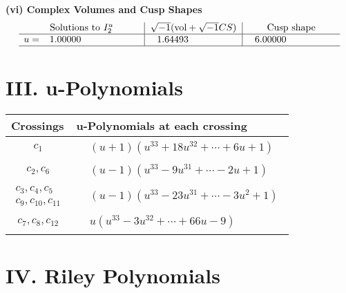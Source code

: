 \documentclass[1p]{elsarticle_modified}
\theoremstyle{definition}
\newcommand{\I}{\sqrt{-1}}
\begin{document}
\newpage\flushleft \textbf{(vi) Complex Volumes and Cusp Shapes}
$$\begin{array}{c|c|c}  
\text{Solutions to }I^u_{2}& \I (\text{vol} + \sqrt{-1}CS) & \text{Cusp shape}\\
 \hline 
\begin{aligned}
u &= \phantom{-}1.00000\phantom{ +0.000000I}\end{aligned}
 & \phantom{-}1.64493\phantom{ +0.000000I} & \phantom{-}6.00000\phantom{ +0.000000I}\\
 \hline 
 \end{array}$$\newpage
\newpage\renewcommand{\arraystretch}{1}
\centering \section*{ III. u-Polynomials}
\begin{tabular}{m{50pt}|m{274pt}}
Crossings & \hspace{64pt}u-Polynomials at each crossing \\
\hline $$\begin{aligned}c_{1}\end{aligned}$$&$\begin{aligned}
&(u+1)(u^{33}+18 u^{32}+\cdots+6 u+1)
\end{aligned}$\\
\hline $$\begin{aligned}c_{2},c_{6}\end{aligned}$$&$\begin{aligned}
&(u-1)(u^{33}-9 u^{31}+\cdots-2 u+1)
\end{aligned}$\\
\hline $$\begin{aligned}c_{3},c_{4},c_{5}\\c_{9},c_{10},c_{11}\end{aligned}$$&$\begin{aligned}
&(u-1)(u^{33}-23 u^{31}+\cdots-3 u^2+1)
\end{aligned}$\\
\hline $$\begin{aligned}c_{7},c_{8},c_{12}\end{aligned}$$&$\begin{aligned}
&u(u^{33}-3 u^{32}+\cdots+66 u-9)
\end{aligned}$\\
\hline
\end{tabular}\newpage\renewcommand{\arraystretch}{1}
\centering \section*{ IV. Riley Polynomials}
\end{document}
